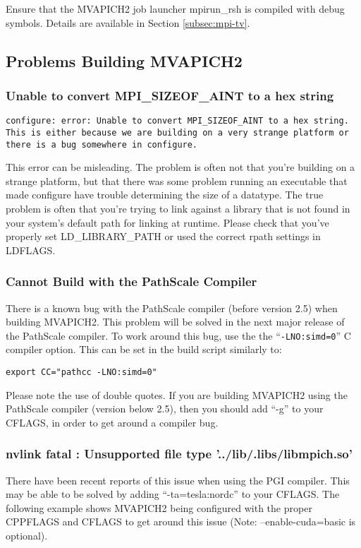 Ensure that the MVAPICH2 job launcher mpirun\_rsh is compiled with debug
symbols. Details are available in Section \ref{subsec:mpi-tv}.

\subsection{Problems Building MVAPICH2}
\subsubsection{Unable to convert MPI\_SIZEOF\_AINT to a hex string}

\texttt{configure: error: Unable to convert MPI\_SIZEOF\_AINT to a hex string.
\\This is either because we are building on a very strange platform or there
is a bug somewhere in configure.}

This error can be misleading.  The problem is often not that you're building on
a strange platform, but that there was some problem running an executable that
made configure have trouble determining the size of a datatype.  The true
problem is often that you're trying to link against a library that is not found
in your system's default path for linking at runtime.  Please check that you've properly set LD\_LIBRARY\_PATH or used the correct rpath settings in LDFLAGS.

\subsubsection{Cannot Build with the PathScale Compiler}

There is a known bug with the PathScale compiler (before version 2.5)
when building MVAPICH2.  This problem will be solved in the next major
release of the PathScale compiler.  To work around this bug, use the the
``\texttt{-LNO:simd=0}'' C compiler option.  This can be set in the
build script similarly to:

\begin{verbatim}
export CC="pathcc -LNO:simd=0"
\end{verbatim}

Please note the use of double quotes. If you are building MVAPICH2 using the
PathScale compiler (version below 2.5), then you should add ``-g'' to your
CFLAGS, in order to get around a compiler bug.

\subsubsection{nvlink fatal : Unsupported file type '../lib/.libs/libmpich.so'}
There have been recent reports of this issue when using the PGI compiler.  This
may be able to be solved by adding ``-ta=tesla:nordc'' to your CFLAGS.  The
following example shows MVAPICH2 being configured with the proper CPPFLAGS and
CFLAGS to get around this issue (Note: --enable-cuda=basic is optional).

